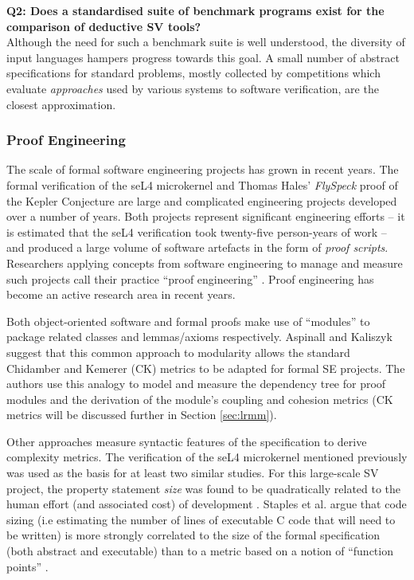 \textbf{Q2: Does a standardised suite of benchmark programs exist for the comparison of deductive SV tools?} \\
Although the need for such a benchmark suite is well understood, the diversity of input languages hampers progress towards this goal. 
A small number of abstract specifications for standard problems, mostly collected by competitions which evaluate \textit{approaches} used by various systems to software verification, are the closest approximation.  

\subsubsection{Proof Engineering}
\label{sub:lrsvmmpe}

The scale of formal software engineering projects has grown in recent years. The formal verification of the seL4 microkernel \cite{Klein:2014:CFV} and Thomas Hales' \textit{FlySpeck} proof of the Kepler Conjecture \cite{hales-kepler} are large and complicated engineering projects developed over a number of years. Both projects represent significant engineering efforts -- it is estimated that the seL4 verification took twenty-five person-years of work -- and produced a large volume of software artefacts in the form of \textit{proof scripts}. Researchers applying concepts from software engineering to manage and measure such projects call their practice ``proof engineering'' \cite{Klein2014}. Proof engineering has become an active research area in recent years. 

Both object-oriented software and formal proofs make use of ``modules'' to package related classes and lemmas/axioms respectively. Aspinall and Kaliszyk \cite{Aspinall2016} suggest that this common approach to modularity allows the standard Chidamber and Kemerer \cite{CandK} (CK) metrics to be adapted for formal SE projects. The authors use this analogy to model and measure the dependency tree for proof modules and the derivation of the module's coupling and cohesion metrics (CK metrics will be discussed further in Section \ref{sec:lrmm}).

Other approaches measure syntactic features of the specification to derive complexity metrics. The verification of the seL4 microkernel mentioned previously was used as the basis for at least two similar studies. For this large-scale SV project, the property statement \textit{size} was found to be quadratically related to the human effort (and associated cost) of development \cite{CostIndicator}. Staples et al. argue that code sizing (i.e estimating the number of lines of executable C code that will need to be written) is more strongly correlated to the size of the formal specification (both abstract and executable) than to a metric based on a notion of ``function points'' \cite{Staples:2013}.
   
